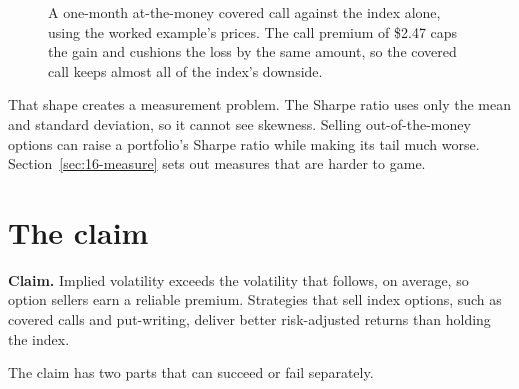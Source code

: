 \begin{figure}[htbp]
\centering
{}
\caption{A one-month at-the-money covered call against the index alone, using the worked example's prices. The call premium of \$2.47 caps the gain and cushions the loss by the same amount, so the covered call keeps almost all of the index's downside.}
\label{fig:16-cc}
\end{figure}

That shape creates a measurement problem. The Sharpe ratio uses only the mean and standard deviation, so it cannot see skewness. Selling out-of-the-money options can raise a portfolio's Sharpe ratio while making its tail much worse. Section~\ref{sec:16-measure} sets out measures that are harder to game.

\section{The claim}
\label{sec:16-claim}

\begin{callout}
\textbf{Claim.} Implied volatility exceeds the volatility that follows, on average, so option sellers earn a reliable premium. Strategies that sell index options, such as covered calls and put-writing, deliver better risk-adjusted returns than holding the index.
\end{callout}

The claim has two parts that can succeed or fail separately.


